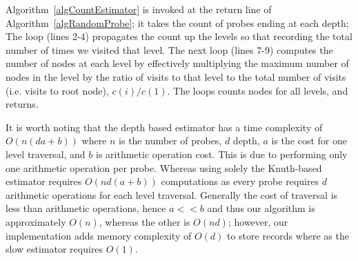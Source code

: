 \documentclass[conference,compsoc]{IEEEtran}
\begin{document}
Algorithm~\ref{algCountEstimator} is invoked at the return line of Algorithm~\ref{algRandomProbe}; it takes the count of probes ending at each depth; The loop (lines 2-4) propagates the count up the levels so that recording the total number of times we visited that level. The next loop (lines 7-9) computes the number of nodes at each level by effectively multiplying the maximum number of nodes in the level by the ratio of visits to that level to the total number of visits (i.e. visits to root node), $c(i)/c(1)$. The loops counts nodes for all levels, and returns.

It is worth noting that the depth based estimator has a time complexity of $O ( n (d  a  + b))$ where $n$ is the number of probes, $d$ depth, $a$ is the cost for one level traversal, and $b$ is arithmetic operation cost. This is due to performing only one arithmetic operation per probe. Whereas using solely the  Knuth-based estimator requires $O ( n  d (a + b) )$ computations as every probe requires $d$ arithmetic operations for each level traversal. Generally the cost of traversal is less than arithmetic operations, hence $a << b$ and thus our algorithm is approximately $O ( n )$, whereas the other is $O ( n  d)$; however, our implementation adds memory complexity of $O ( d )$ to store records where as the slow estimator requires $O( 1 )$.
\end{document}
